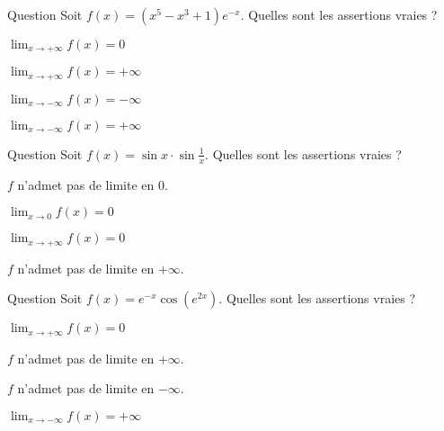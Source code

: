 \begin{multi}[multiple,feedback=
{Si \(\alpha\) et \( \beta\) sont des réels \(>0\), 
alors  en \(+\infty\), on a :
\( x^{\alpha}\ll  e^{\beta x}\), où la notation \(f\ll g\) signifie : \(\lim_{x \to + \infty} \frac{f(x)}{g(x)}=0 \).
}]{Question}
Soit \(f(x)= (x^5-x^3+1)e^{-x}\). Quelles sont les assertions vraies ?

    \item* \(\lim_{x\to +\infty} f(x)=0\)
    \item \(\lim_{x\to +\infty} f(x)=+\infty\)
    \item* \(\lim_{x\to -\infty} f(x)=-\infty\)
    \item \(\lim_{x\to -\infty} f(x)=+\infty\)
\end{multi}


\begin{multi}[multiple,feedback=
{Encadrer \(\sin\frac{1}{x}\) pour la limite en \(0\)   et encadrer \(\sin x\) pour la limite en \(+\infty\).
}]{Question}
Soit \(f(x)= \sin x \cdot  \sin\frac{1}{x}\). Quelles sont les assertions vraies ?

    \item \(f\) n'admet pas de limite en \(0\).
    \item* \(\lim_{x\to 0} f(x)=0\)
    \item* \(\lim_{x\to +\infty} f(x)=0\)
    \item \(f\) n'admet pas de limite en \(+\infty\).
\end{multi}


\begin{multi}[multiple,feedback=
{Encadrer \(\cos(e^{2x})\) pour la limite en \(+\infty\).
}]{Question}
Soit \(f(x)= e^{-x}\cos(e^{2x})\). Quelles sont les assertions vraies ?

    \item* \(\lim_{x\to +\infty} f(x)=0\)
    \item \(f\) n'admet pas de limite en \(+\infty\).
    \item \(f\) n'admet pas de limite en \(-\infty\).
    \item* \(\lim_{x\to -\infty} f(x)=+\infty\)
\end{multi}


